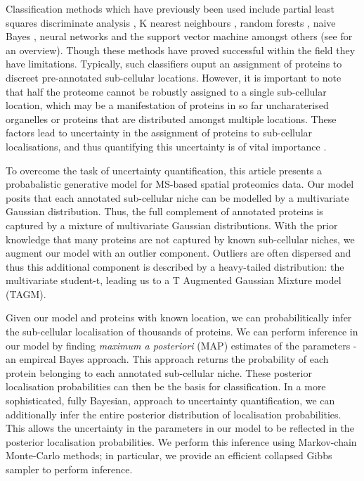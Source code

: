 \documentclass[12pt,english]{article}\usepackage[]{graphicx}\usepackage[]{color}
\begin{document}
Classification methods which have previously been used include partial
least squares discriminate analysis \citep{Dunkley:2006}, K nearest
neighbours \citep{Groen::2014}, random forests \citep{Ohta::2010},
naive Bayes \citep{Nikolovski::2012}, neural networks
\citep{Tardif::2012} and the support vector machine amongst others
(see \cite{Gatto:2014b} for an overview). Though these methods have
proved successful within the field they have limitations. Typically,
such classifiers ouput an assignment of proteins to discreet
pre-annotated sub-cellular locations. However, it is important to note
that half the proteome cannot be robustly assigned to a single
sub-cellular location, which may be a manifestation of proteins in so
far uncharaterised organelles or proteins that are distributed amongst
multiple locations. These factors lead to uncertainty in the
assignment of proteins to sub-cellular localisations, and thus
quantifying this uncertainty is of vital importance \citep{Kirk:2015}.

To overcome the task of uncertainty quantification, this article
presents a probabalistic generative model for MS-based spatial
proteomics data. Our model posits that each annotated sub-cellular
niche can be modelled by a multivariate Gaussian distribution. Thus,
the full complement of annotated proteins is captured by a mixture of
multivariate Gaussian distributions. With the prior knowledge that
many proteins are not captured by known sub-cellular niches, we
augment our model with an outlier component. Outliers are often
dispersed and thus this additional component is described by a
heavy-tailed distribution: the multivariate student-t, leading us to a
T Augmented Gaussian Mixture model (TAGM).

Given our model and proteins with known location, we can probabilitically infer the sub-cellular localisation of thousands of proteins. We can perform inference in our model by finding \textit{maximum a posteriori} (MAP) estimates of the parameters - an empircal Bayes approach. This approach returns the probability of each protein belonging to each annotated sub-cellular niche. These posterior localisation probabilities can then be the basis for classification. In a more sophisticated, fully Bayesian, approach to uncertainty quantification, we can additionally infer the entire posterior distribution of
localisation probabilities. This allows the uncertainty in the parameters in our model to be reflected
in the posterior localisation probabilities. We perform this inference using Markov-chain Monte-Carlo methods;
in particular, we provide an efficient collapsed Gibbs sampler to perform inference.
\end{document}
